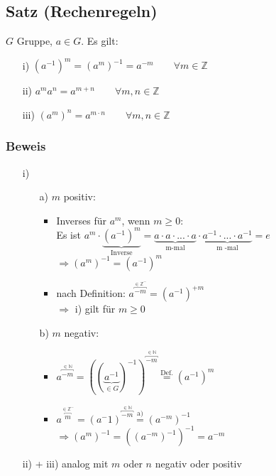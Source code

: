 \documentclass[a4paper, 12pt,titlepage, pdf, headsepline]{article}
\renewcommand{\>}{\rightarrow}
\renewcommand{\*}{\cdot}
\begin{document}
	      \subsection{Satz (Rechenregeln)}
	      $G$ Gruppe, $a \in G$. Es gilt:
	      \begin{itemize}
	      	\item[i)] $(a^{-1})^m = (a^m)^{-1} = a^{-m} \qquad \forall m \in \mathds{Z}$
	      	\item[ii)] $a^ma^n = a^{m+n} \qquad \forall m,n \in \mathds{Z}$
	      	\item[iii)] $(a^m)^n = a^{m \cdot n} \qquad \forall m,n \in \mathds{Z}$
	      \end{itemize}
	      \subsubsection*{Beweis}
	      \begin{itemize}
	      	\item[i)] 
	      	      \begin{itemize}
	      	      	\item[a)] $m$ positiv:
	      	      	      \begin{itemize}
	      	      	      	\item Inverses für $a^m$, wenn $m \geq 0:$ \\
	      	      	      	      Es ist $a^m  \cdot \underbrace{(a^{-1})^m}_{\text{Inverse}} = \underbrace{a \cdot a \cdot ... \cdot a}_{\text{m-mal}} \cdot \underbrace{ a^{-1} \cdot ... \cdot a^{-1}}_{\text{m -mal}} = e$ \\
	      	      	      	      $\Rightarrow (a^m)^{-1}= (a^{-1})^m$
	      	      	      	\item nach Definition: $a^{\overbracket{-m}^{\in \mathds{Z^-}}} = (a^{-1})^{+m}$ \\
	      	      	      	      $\Rightarrow$ i) gilt für $m \geq 0$
	      	      	      \end{itemize}
	      	      	\item[b)] $m$ negativ:
	      	      	      \begin{itemize}
	      	      	      	\item $a^{\overbracket{-m}^{ \in \mathds{N}}} = ((\underbrace{a^{-1}}_{\in G})^{-1})^{\overbracket{-m}^{ \in \mathds{N}}} \overset{\textrm{Def.}}{=} (a^{-1})^m$
	      	      	      	\item $a^{\overbracket{m}^{ \in \mathds{Z}^-}} = (a^-1)^{\overbracket{-m}^{ \in \mathds{N}}} \overset{\textrm{a)}}{=} (a^{-m})^{-1}$\\$ \Rightarrow (a^m)^{-1} = ((a^{-m})^{-1})^{-1} = a^{-m}$
	      	      	      \end{itemize}	
	      	      \end{itemize}
	      	\item[ii) + iii)] analog mit $m$ oder $n$ negativ oder positiv 
	      \end{itemize}
\end{document}
